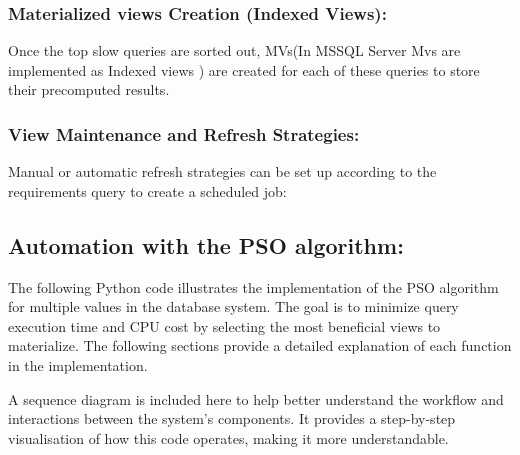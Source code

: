 \subsubsection{ Materialized views Creation (Indexed Views):}\label{Query_decomposition} Once the top slow queries are sorted out, MVs(In MSSQL Server Mvs are implemented as Indexed views ) are created for each of these queries to store their precomputed results.\vspace{.4cm}

  \vspace{.4cm}

  \subsubsection{View Maintenance and Refresh Strategies:}\label{View_maintainance} Manual or automatic refresh strategies can be set up according to the requirements query to create a scheduled job: \vspace{.4cm}




\subsection{Automation with the PSO algorithm:} \label{Cost_evaluation}
 The following Python code illustrates the implementation of the PSO algorithm for multiple values in the database system. The goal is to minimize query execution time and CPU cost by selecting the most beneficial views to materialize. The following sections provide a detailed explanation of each function in the implementation.




\vspace{.4cm}

A sequence diagram is included here to help better understand the workflow and interactions between the system's components. It provides a step-by-step visualisation of how this code operates, making it more understandable.
  



